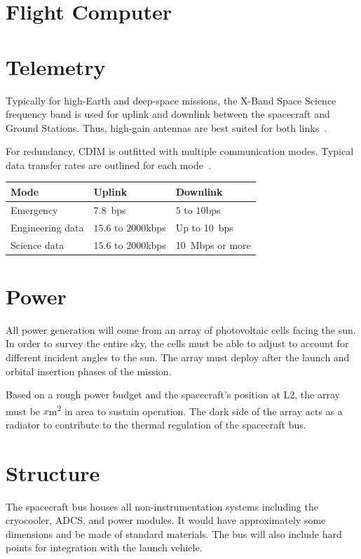 \documentclass{ws-jai}
\begin{document}
\section{Flight Computer}

\section{Telemetry}
\label{sec:telemetry}
Typically for high-Earth and deep-space missions, the X-Band Space Science frequency band is used for uplink and downlink between the spacecraft and Ground Stations.
Thus, high-gain antennas are best suited for both links~\cite{smad2015}.
\begin{wstable}[htp]
  \caption{For redundancy, CDIM is outfitted with multiple communication modes. Typical data transfer rates are outlined for each mode~\cite{smad2015}.
\label{tab:telemetry}}
  \begin{tabular}{@{}lll@{}} \toprule
    Mode & Uplink & Downlink \\ \midrule
    Emergency & \SI{7.8}{bps} & $5$ to $10$\si{bps} \\
    Engineering data & $15.6$ to $2000$\si{kbps} & Up to \SI{10}{bps} \\
    Science data & $15.6$ to $2000$\si{kbps} & \SI{10}{Mbps} or more\\\bottomrule
  \end{tabular}
\end{wstable}

\section{Power}
\label{sec:power}
All power generation will come from an array of photovoltaic cells facing the sun.
In order to survey the entire sky, the cells must be able to adjust to account for different incident angles to the sun.
The array must deploy after the launch and orbital insertion phases of the mission.

Based on a rough power budget and the spacecraft's position at L2, the array must be $x$\si{\meter\squared} in area to sustain operation.
The dark side of the array acts as a radiator to contribute to the thermal regulation of the spacecraft bus.

\section{Structure}
\label{sec:structure}
The spacecraft bus houses all non-instrumentation systems including the cryocooler, ADCS, and power modules.
It would have approximately some dimensions and be made of standard materials.
The bus will also include hard points for integration with the launch vehicle.
\end{document}
